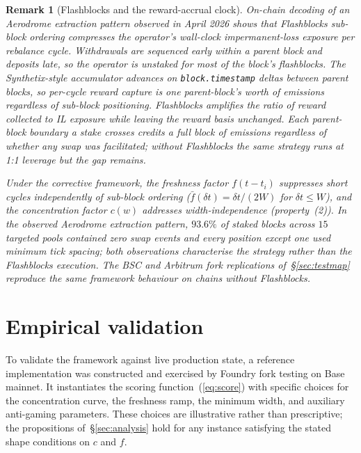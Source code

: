 \documentclass[11pt,a4paper]{article}
\theoremstyle{cgdefinition}
\theoremstyle{cgplain}
\theoremstyle{cgremark}
\newtheorem{remark}{Remark}
\begin{document}
\begin{remark}[Flashblocks and the reward-accrual clock]\label{rem:flashblocks}
On-chain decoding of an Aerodrome extraction pattern observed in April 2026 shows that Flashblocks sub-block ordering compresses the operator's wall-clock impermanent-loss exposure per rebalance cycle. Withdrawals are sequenced early within a parent block and deposits late, so the operator is unstaked for most of the block's flashblocks. The Synthetix-style accumulator advances on \texttt{block.timestamp} deltas between parent blocks, so per-cycle reward capture is one parent-block's worth of emissions regardless of sub-block positioning. Flashblocks amplifies the ratio of reward collected to IL exposure while leaving the reward basis unchanged. Each parent-block boundary a stake crosses credits a full block of emissions regardless of whether any swap was facilitated; without Flashblocks the same strategy runs at 1:1 leverage but the gap remains.

Under the corrective framework, the freshness factor $f(t - t_i)$ suppresses short cycles independently of sub-block ordering ($\bar f(\delta t) = \delta t/(2W)$ for $\delta t \leq W$), and the concentration factor $c(w)$ addresses width-independence (property~(2)). In the observed Aerodrome extraction pattern, $93.6\%$ of staked blocks across $15$ targeted pools contained zero swap events and every position except one used minimum tick spacing; both observations characterise the strategy rather than the Flashblocks execution. The BSC and Arbitrum fork replications of~\S\ref{sec:testmap} reproduce the same framework behaviour on chains without Flashblocks.
\end{remark}

\section{Empirical validation}\label{sec:empirical}

To validate the framework against live production state, a reference implementation was constructed and exercised by Foundry fork testing on Base mainnet. It instantiates the scoring function~(\ref{eq:score}) with specific choices for the concentration curve, the freshness ramp, the minimum width, and auxiliary anti-gaming parameters. These choices are illustrative rather than prescriptive; the propositions of~\S\ref{sec:analysis} hold for any instance satisfying the stated shape conditions on $c$ and $f$.
\end{document}
